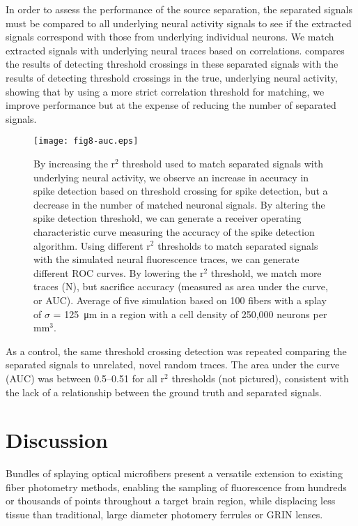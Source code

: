 In order to assess the performance of the source separation, the separated signals must be compared to all underlying neural activity signals to see if the extracted signals correspond with those from underlying individual neurons. We match extracted signals with underlying neural traces based on correlations.  compares the results of detecting threshold crossings in these separated signals with the results of detecting threshold crossings in the true, underlying neural activity, showing that by using a more strict correlation threshold for matching, we improve performance but at the expense of reducing the number of separated signals. 

\begin{figure}
\texttt{[image: fig8-auc.eps]}
\caption[Performance of source separation on threshold crossing task]{By increasing the r$^2$ threshold used to match separated signals with underlying neural activity, we observe an increase in accuracy in spike detection based on threshold crossing for spike detection, but a decrease in the number of matched neuronal signals. By altering the spike detection threshold, we can generate a receiver operating characteristic curve measuring the accuracy of the spike detection algorithm. Using different r$^2$ thresholds to match separated signals with the simulated neural fluorescence traces, we can generate different ROC curves. By lowering the r$^2$ threshold, we match more traces (N), but sacrifice accuracy (measured as area under the curve, or AUC). Average of five simulation based on 100 fibers with a splay of $\sigma$ = 125~\si{\micro\meter} in a region with a cell density of 250,000 neurons per mm$^3$.}
\label{fig:auc}
\end{figure}

As a control, the same threshold crossing detection was repeated comparing the separated signals to unrelated, novel random traces. The area under the curve (AUC) was between 0.5--0.51 for all r$^2$ thresholds (not pictured), consistent with the lack of a relationship between the ground truth and separated signals.

\section{Discussion}

Bundles of splaying optical microfibers present a versatile extension to existing fiber photometry methods, enabling the sampling of fluorescence from hundreds or thousands of points throughout a target brain region, while displacing less tissue than traditional, large diameter photomery ferrules or GRIN lenses.

